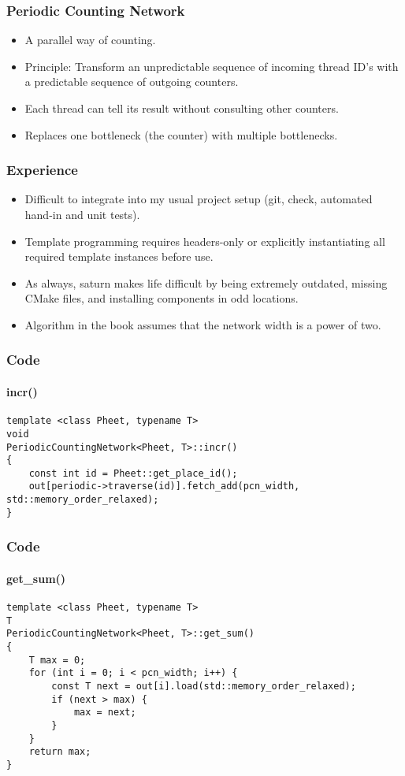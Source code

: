 \documentclass[notes=show]{beamer}
\begin{document}
\begin{frame}
\frametitle{Periodic Counting Network}
\begin{itemize}
\item A parallel way of counting.
\item Principle: Transform an unpredictable sequence of incoming thread ID's 
      with a predictable sequence of outgoing counters.
\item Each thread can tell its result without consulting other counters.
\item Replaces one bottleneck (the counter) with multiple bottlenecks.
\end{itemize}
\end{frame}

\begin{frame}
\frametitle{Experience}
\begin{itemize}
\item Difficult to integrate into my usual project setup (git, check, automated
      hand-in and unit tests).
\item Template programming requires headers-only or explicitly instantiating all
      required template instances before use.
\item As always, saturn makes life difficult by being extremely outdated,
      missing CMake files, and installing components in odd locations.
\item Algorithm in the book assumes that the network width is a power of two.
\end{itemize}
\end{frame}

\begin{frame}[fragile]
\frametitle{Code}
\framesubtitle{incr()}
\begin{lstlisting}
template <class Pheet, typename T>
void
PeriodicCountingNetwork<Pheet, T>::incr()
{
    const int id = Pheet::get_place_id();
    out[periodic->traverse(id)].fetch_add(pcn_width, std::memory_order_relaxed);
}
\end{lstlisting}
\end{frame}

\begin{frame}[fragile]
\frametitle{Code}
\framesubtitle{get\_sum()}
\begin{lstlisting}
template <class Pheet, typename T>
T
PeriodicCountingNetwork<Pheet, T>::get_sum()
{
    T max = 0;
    for (int i = 0; i < pcn_width; i++) {
        const T next = out[i].load(std::memory_order_relaxed);
        if (next > max) {
            max = next;
        }
    }
    return max;
}
\end{lstlisting}
\end{frame}
\end{document}
